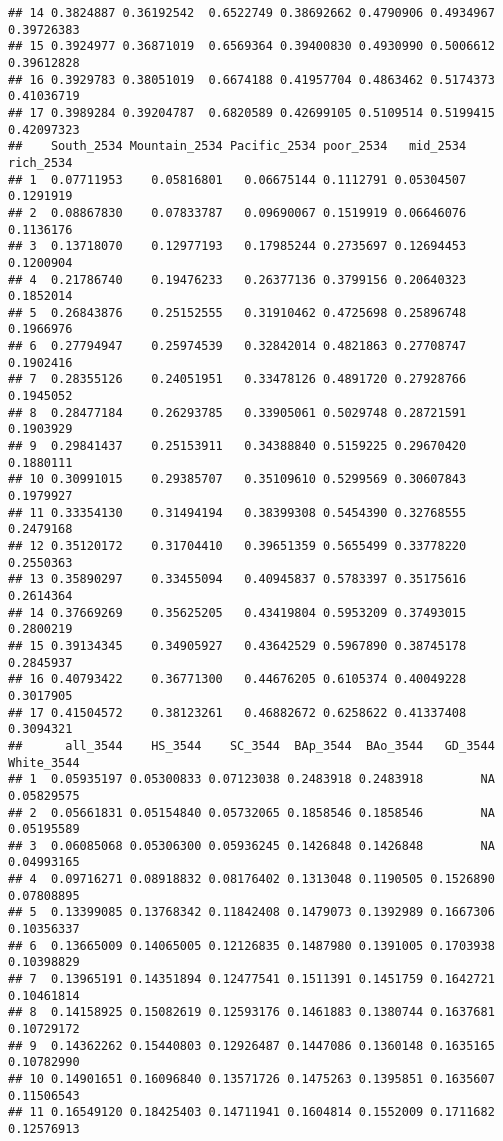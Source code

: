 \documentclass[
]{article}
\begin{document}
\begin{verbatim}
## 14 0.3824887 0.36192542  0.6522749 0.38692662 0.4790906 0.4934967   0.39726383
## 15 0.3924977 0.36871019  0.6569364 0.39400830 0.4930990 0.5006612   0.39612828
## 16 0.3929783 0.38051019  0.6674188 0.41957704 0.4863462 0.5174373   0.41036719
## 17 0.3989284 0.39204787  0.6820589 0.42699105 0.5109514 0.5199415   0.42097323
##    South_2534 Mountain_2534 Pacific_2534 poor_2534   mid_2534 rich_2534
## 1  0.07711953    0.05816801   0.06675144 0.1112791 0.05304507 0.1291919
## 2  0.08867830    0.07833787   0.09690067 0.1519919 0.06646076 0.1136176
## 3  0.13718070    0.12977193   0.17985244 0.2735697 0.12694453 0.1200904
## 4  0.21786740    0.19476233   0.26377136 0.3799156 0.20640323 0.1852014
## 5  0.26843876    0.25152555   0.31910462 0.4725698 0.25896748 0.1966976
## 6  0.27794947    0.25974539   0.32842014 0.4821863 0.27708747 0.1902416
## 7  0.28355126    0.24051951   0.33478126 0.4891720 0.27928766 0.1945052
## 8  0.28477184    0.26293785   0.33905061 0.5029748 0.28721591 0.1903929
## 9  0.29841437    0.25153911   0.34388840 0.5159225 0.29670420 0.1880111
## 10 0.30991015    0.29385707   0.35109610 0.5299569 0.30607843 0.1979927
## 11 0.33354130    0.31494194   0.38399308 0.5454390 0.32768555 0.2479168
## 12 0.35120172    0.31704410   0.39651359 0.5655499 0.33778220 0.2550363
## 13 0.35890297    0.33455094   0.40945837 0.5783397 0.35175616 0.2614364
## 14 0.37669269    0.35625205   0.43419804 0.5953209 0.37493015 0.2800219
## 15 0.39134345    0.34905927   0.43642529 0.5967890 0.38745178 0.2845937
## 16 0.40793422    0.36771300   0.44676205 0.6105374 0.40049228 0.3017905
## 17 0.41504572    0.38123261   0.46882672 0.6258622 0.41337408 0.3094321
##      all_3544    HS_3544    SC_3544  BAp_3544  BAo_3544   GD_3544 White_3544
## 1  0.05935197 0.05300833 0.07123038 0.2483918 0.2483918        NA 0.05829575
## 2  0.05661831 0.05154840 0.05732065 0.1858546 0.1858546        NA 0.05195589
## 3  0.06085068 0.05306300 0.05936245 0.1426848 0.1426848        NA 0.04993165
## 4  0.09716271 0.08918832 0.08176402 0.1313048 0.1190505 0.1526890 0.07808895
## 5  0.13399085 0.13768342 0.11842408 0.1479073 0.1392989 0.1667306 0.10356337
## 6  0.13665009 0.14065005 0.12126835 0.1487980 0.1391005 0.1703938 0.10398829
## 7  0.13965191 0.14351894 0.12477541 0.1511391 0.1451759 0.1642721 0.10461814
## 8  0.14158925 0.15082619 0.12593176 0.1461883 0.1380744 0.1637681 0.10729172
## 9  0.14362262 0.15440803 0.12926487 0.1447086 0.1360148 0.1635165 0.10782990
## 10 0.14901651 0.16096840 0.13571726 0.1475263 0.1395851 0.1635607 0.11506543
## 11 0.16549120 0.18425403 0.14711941 0.1604814 0.1552009 0.1711682 0.12576913

\end{verbatim}
\end{document}
